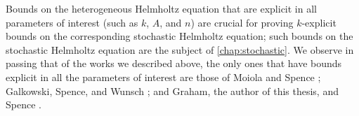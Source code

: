Bounds on the heterogeneous Helmholtz equation that are explicit in all parameters of interest (such as $k$, $A$, and $n$) are crucial for proving $k$-explicit bounds on the corresponding stochastic Helmholtz equation; such bounds on the stochastic Helmholtz equation are the subject of \cref{chap:stochastic}. We observe in passing that of the works we described above, the only ones that have bounds explicit in all the parameters of interest are those of Moiola and Spence \cite{MoSp:19}; Galkowski, Spence, and Wunsch \cite{GaSpWu:18}; and Graham, the author of this thesis, and Spence \cite{GrPeSp:19}.%
\ere
